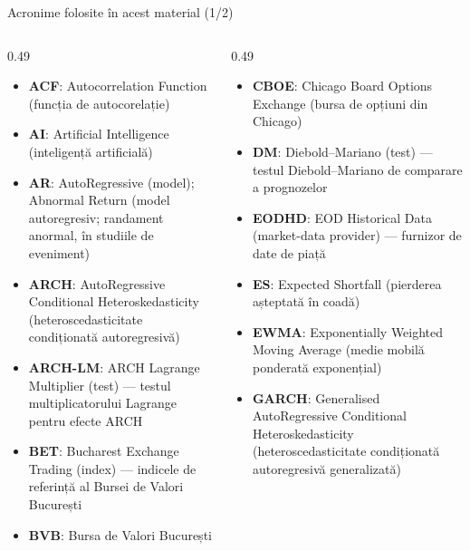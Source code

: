 \begin{frame}{Acronime folosite în acest material (1/2)}
\begin{columns}[T]
\begin{column}{0.49\textwidth}
\begin{itemize}\setlength{\itemsep}{0pt}
    \item \textbf{ACF}: Autocorrelation Function (funcția de autocorelație)
    \item \textbf{AI}: Artificial Intelligence (inteligență artificială)
    \item \textbf{AR}: AutoRegressive (model); Abnormal Return (model autoregresiv; randament anormal, în studiile de eveniment)
    \item \textbf{ARCH}: AutoRegressive Conditional Heteroskedasticity (heteroscedasticitate condiționată autoregresivă)
    \item \textbf{ARCH-LM}: ARCH Lagrange Multiplier (test) — testul multiplicatorului Lagrange pentru efecte ARCH
    \item \textbf{BET}: Bucharest Exchange Trading (index) — indicele de referință al Bursei de Valori București
    \item \textbf{BVB}: Bursa de Valori București
\end{itemize}
\end{column}
\begin{column}{0.49\textwidth}
\begin{itemize}\setlength{\itemsep}{0pt}
    \item \textbf{CBOE}: Chicago Board Options Exchange (bursa de opțiuni din Chicago)
    \item \textbf{DM}: Diebold–Mariano (test) — testul Diebold–Mariano de comparare a prognozelor
    \item \textbf{EODHD}: EOD Historical Data (market-data provider) — furnizor de date de piață
    \item \textbf{ES}: Expected Shortfall (pierderea așteptată în coadă)
    \item \textbf{EWMA}: Exponentially Weighted Moving Average (medie mobilă ponderată exponențial)
    \item \textbf{GARCH}: Generalised AutoRegressive Conditional Heteroskedasticity (heteroscedasticitate condiționată autoregresivă generalizată)
\end{itemize}
\end{column}
\end{columns}
\end{frame}
